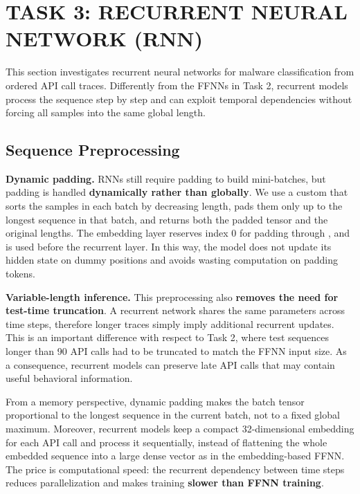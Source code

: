 
\section{TASK 3: RECURRENT NEURAL NETWORK (RNN)} \label{sec:task3}

This section investigates recurrent neural networks for malware classification from ordered API call traces. Differently from the FFNNs in Task 2, recurrent models process the sequence step by step and can exploit temporal dependencies without forcing all samples into the same global length.

\subsection{Sequence Preprocessing} \label{subsec:task3_preprocessing}

\textbf{Dynamic padding.} RNNs still require padding to build mini-batches, but padding is handled \textbf{dynamically rather than globally}. We use a custom  that sorts the samples in each batch by decreasing length, pads them only up to the longest sequence in that batch, and returns both the padded tensor and the original lengths. The embedding layer reserves index 0 for padding through , and  is used before the recurrent layer. In this way, the model does not update its hidden state on dummy positions and avoids wasting computation on padding tokens.

\textbf{Variable-length inference.} This preprocessing also \textbf{removes the need for test-time truncation}. A recurrent network shares the same parameters across time steps, therefore longer traces simply imply additional recurrent updates. This is an important difference with respect to Task 2, where test sequences longer than 90 API calls had to be truncated to match the FFNN input size. As a consequence, recurrent models can preserve late API calls that may contain useful behavioral information.

From a memory perspective, dynamic padding makes the batch tensor proportional to the longest sequence in the current batch, not to a fixed global maximum. Moreover, recurrent models keep a compact 32-dimensional embedding for each API call and process it sequentially, instead of flattening the whole embedded sequence into a large dense vector as in the embedding-based FFNN. The price is computational speed: the recurrent dependency between time steps reduces parallelization and makes training \textbf{slower than FFNN training}.

